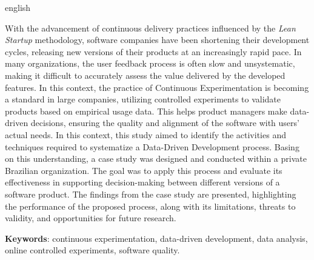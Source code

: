 \begin{resumo}[Abstract]
 \begin{otherlanguage*}{english}

With the advancement of continuous delivery practices influenced by the \textit{Lean Startup} methodology, software companies have been shortening their development cycles, releasing new versions of their products at an increasingly rapid pace. In many organizations, the user feedback process is often slow and unsystematic, making it difficult to accurately assess the value delivered by the developed features. In this context, the practice of Continuous Experimentation is becoming a standard in large companies, utilizing controlled experiments to validate products based on empirical usage data. This helps product managers make data-driven decisions, ensuring the quality and alignment of the software with users' actual needs. In this context, this study aimed to identify the activities and techniques required to systematize a Data-Driven Development process. Basing on this understanding, a case study was designed and conducted within a private Brazilian organization. The goal was to apply this process and evaluate its effectiveness in supporting decision-making between different versions of a software product. The findings from the case study are presented, highlighting the performance of the proposed process, along with its limitations, threats to validity, and opportunities for future research.

\vspace{\onelineskip}

\noindent
\textbf{Keywords}: continuous experimentation, data-driven development, data analysis, online controlled experiments, software quality.

 \end{otherlanguage*}
\end{resumo}
